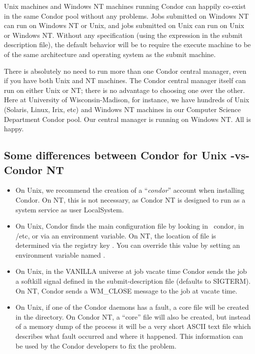 Unix machines and Windows NT machines running Condor can happily
co-exist in the same Condor pool without any problems.
Jobs submitted on Windows NT can run on Windows NT or Unix,
and jobs submitted on Unix can run on Unix or Windows NT.
Without any specification
(using the  expression in the submit description file),
the default behavior will be to 
require the execute machine to be of the same architecture and operating
system as the submit machine.

There is absolutely no need to run more than one Condor central manager,
even if you have both Unix and NT machines.  The Condor central manager
itself can run on either Unix or NT; there is no advantage to choosing
one over the other.  Here at University of Wisconsin-Madison, for
instance, we have hundreds of Unix (Solaris, Linux, Irix, etc) and
Windows NT machines in our Computer Science Department Condor pool.
Our central manager is running on Windows NT.  All is happy.

\subsection{Some differences between Condor for Unix -vs- Condor NT}

\begin{itemize}

\item On Unix, we recommend the creation of a ``\textit{condor}'' account
when installing Condor.  On NT, this is not necessary, as Condor NT is
designed to run as a system service as user LocalSystem.

\item On Unix, Condor finds the  main configuration
file by looking in ~condor, in /etc, or via an environment variable.
On NT, the location of  file is determined
via the registry key .
You can override this value by setting an environment variable named
.

\item On Unix, in the VANILLA universe at job vacate time Condor sends the
job a softkill signal defined in the submit-description file (defaults to
SIGTERM).  On NT, Condor sends a WM\_CLOSE message to the job at vacate
time.

\item On Unix, if one of the Condor daemons has a fault, a core file
will be created in the  directory.  On Condor NT, a
``core'' file will also be created, but instead of a memory dump of the
process it will be a very short ASCII text file which describes what
fault occurred and where it happened.  This information can be used by
the Condor developers to fix the problem.

\end{itemize}
